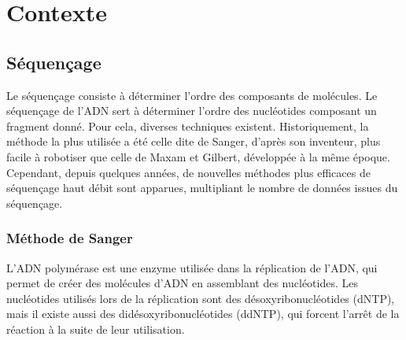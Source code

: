 \section{Contexte}

%
%
%
%


\subsection{Séquençage}
Le séquençage consiste à déterminer l'ordre des composants de molécules. Le séquençage de l'ADN sert à déterminer l'ordre des nucléotides composant un fragment donné. Pour cela, diverses techniques existent. Historiquement, la méthode la plus utilisée a été celle dite de Sanger, d'après son inventeur, plus facile à robotiser que celle de Maxam et Gilbert, développée à la même époque. Cependant, depuis quelques années, de nouvelles méthodes plus efficaces de séquençage haut débit sont apparues, multipliant le nombre de données issues du séquençage.

\subsubsection{Méthode de Sanger}
L'ADN polymérase est une enzyme utilisée dans la réplication de l'ADN, qui permet de créer des molécules d'ADN en assemblant des nucléotides. Les nucléotides utilisés lors de la réplication sont des désoxyribonucléotides (dNTP), mais il existe aussi des didésoxyribonucléotides (ddNTP), qui forcent l’arrêt de la réaction à la suite de leur utilisation. 


